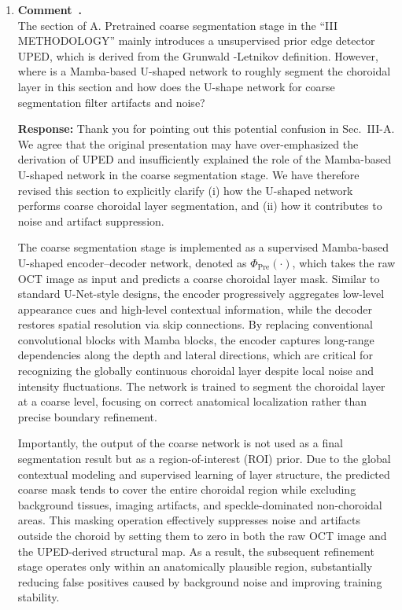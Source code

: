 \documentclass[11pt]{article}
\newcommand{\commentresponse}[2]{{\color{blue}\textbf{Response:} #2}}
\newcommand{\commentitem}{\item \textbf{Comment~\arabic{enumi}.}\\\ignorespaces}
\begin{document}
\begin{enumerate}
    \commentitem The section of A. Pretrained coarse segmentation stage in the “III METHODOLOGY” mainly introduces a unsupervised prior edge detector UPED, which is derived from the Grunwald -Letnikov definition. However, where is a Mamba-based U-shaped network to roughly segment the choroidal layer in this section and how does the U-shape network for coarse segmentation filter artifacts and noise?
    
    \commentresponse{3}{
    Thank you for pointing out this potential confusion in Sec.~III-A.
    We agree that the original presentation may have over-emphasized the derivation of UPED and insufficiently explained the role of the Mamba-based U-shaped network in the coarse segmentation stage.
    We have therefore revised this section to explicitly clarify (i) how the U-shaped network performs coarse choroidal layer segmentation, and (ii) how it contributes to noise and artifact suppression.
    
    The coarse segmentation stage is implemented as a supervised Mamba-based U-shaped encoder--decoder network, denoted as $\varPhi_{\text{Pre}}(\cdot)$, which takes the raw OCT image as input and predicts a coarse choroidal layer mask.
    Similar to standard U-Net-style designs, the encoder progressively aggregates low-level appearance cues and high-level contextual information, while the decoder restores spatial resolution via skip connections.
    By replacing conventional convolutional blocks with Mamba blocks, the encoder captures long-range dependencies along the depth and lateral directions, which are critical for recognizing the globally continuous choroidal layer despite local noise and intensity fluctuations.
    The network is trained to segment the choroidal layer at a coarse level, focusing on correct anatomical localization rather than precise boundary refinement.
    
    Importantly, the output of the coarse network is not used as a final segmentation result but as a region-of-interest (ROI) prior.
    Due to the global contextual modeling and supervised learning of layer structure, the predicted coarse mask tends to cover the entire choroidal region while excluding background tissues, imaging artifacts, and speckle-dominated non-choroidal areas.
    This masking operation effectively suppresses noise and artifacts outside the choroid by setting them to zero in both the raw OCT image and the UPED-derived structural map.
    As a result, the subsequent refinement stage operates only within an anatomically plausible region, substantially reducing false positives caused by background noise and improving training stability.
    
}
\end{enumerate}
\end{document}
